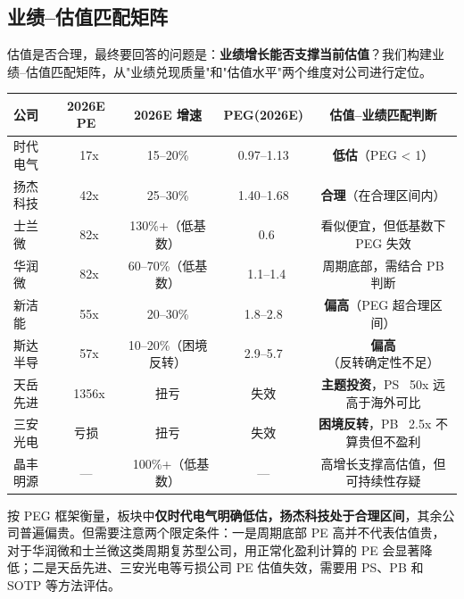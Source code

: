 \subsection{业绩--估值匹配矩阵}

估值是否合理，最终要回答的问题是：\textbf{业绩增长能否支撑当前估值}？我们构建业绩--估值匹配矩阵，从"业绩兑现质量"和"估值水平"两个维度对公司进行定位。

\begin{exhibitbox}[表 7-11：业绩--估值匹配矩阵]
\centering
\small
\begin{tabularx}{\textwidth}{X c c c c}
\toprule
\textbf{公司} & \textbf{2026E PE} & \textbf{2026E 增速} & \textbf{PEG(2026E)} & \textbf{估值--业绩匹配判断} \\
\midrule
\rowcolor{riskgreen!10}
时代电气 & ~17x & 15–20\% & 0.97–1.13 & \textbf{低估}（PEG < 1） \\
\rowcolor{riskgreen!10}
扬杰科技 & ~42x & 25–30\% & 1.40–1.68 & \textbf{合理}（在合理区间内） \\
\rowcolor{riskamber!10}
士兰微 & ~82x & 130\%+（低基数） & ~0.6 & 看似便宜，但低基数下 PEG 失效 \\
\rowcolor{riskamber!10}
华润微 & ~82x & 60–70\%（低基数） & ~1.1–1.4 & 周期底部，需结合 PB 判断 \\
\rowcolor{riskred!10}
新洁能 & ~55x & 20–30\% & 1.8–2.8 & \textbf{偏高}（PEG 超合理区间） \\
\rowcolor{riskred!10}
斯达半导 & ~57x & 10–20\%（困境反转） & 2.9–5.7 & \textbf{偏高}（反转确定性不足） \\
\rowcolor{riskred!10}
天岳先进 & ~1356x & 扭亏 & 失效 & \textbf{主题投资}，PS ~50x 远高于海外可比 \\
\rowcolor{riskred!10}
三安光电 & 亏损 & 扭亏 & 失效 & \textbf{困境反转}，PB ~2.5x 不算贵但不盈利 \\
\rowcolor{riskamber!10}
晶丰明源 & — & ~100\%+（低基数） & — & 高增长支撑高估值，但可持续性存疑 \\
\bottomrule
\end{tabularx}
\end{exhibitbox}

按 PEG 框架衡量，板块中\textbf{仅时代电气明确低估，扬杰科技处于合理区间}，其余公司普遍偏贵。但需要注意两个限定条件：一是周期底部 PE 高并不代表估值贵，对于华润微和士兰微这类周期复苏型公司，用正常化盈利计算的 PE 会显著降低；二是天岳先进、三安光电等亏损公司 PE 估值失效，需要用 PS、PB 和 SOTP 等方法评估。

